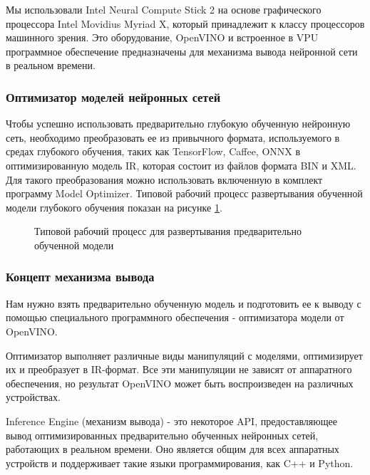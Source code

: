 \documentclass[14pt,a4paper]{scrartcl}
\begin{document}
			Мы использовали Intel Neural Compute Stick 2 на основе графического процессора Intel Movidius Myriad X, который принадлежит к классу процессоров машинного зрения. Это оборудование, OpenVINO и встроенное в VPU программное обеспечение предназначены для механизма вывода нейронной сети в реальном времени.
		
		\subsubsection{Оптимизатор моделей нейронных сетей}
		
			Чтобы успешно использовать предварительно глубокую обученную нейронную сеть, необходимо преобразовать ее из привычного формата, используемого в средах глубокого обучения, таких как TensorFlow, Caffee, ONNX в оптимизированную модель IR, которая состоит из файлов формата BIN и XML. Для такого преобразования можно использовать включенную в комплект программу Model Optimizer. Типовой рабочий процесс развертывания обученной модели глубокого обучения показан на рисунке \ref{fig:Model_Optimizer_Structure}\cite{bib:Model_Optimizer_Dev_Guide}.
			
			\begin{figure}[h]
				\caption{Типовой рабочий процесс для развертывания предварительно обученной модели}
				\label{fig:Model_Optimizer_Structure}
			\end{figure}
		
		\subsubsection{Концепт механизма вывода}
		
			Нам нужно взять предварительно обученную модель и подготовить ее к выводу с помощью специального программного обеспечения - оптимизатора модели от OpenVINO.
			
			Оптимизатор выполняет различные виды манипуляций с моделями, оптимизирует их и преобразует в IR-формат. Все эти манипуляции не зависят от аппаратного обеспечения, но результат OpenVINO может быть воспроизведен на различных устройствах\cite{bib:Deep_Learning_Computer_Vision}.	
			
			Inference Engine (механизм вывода) - это некоторое API, предоставляющее вывод оптимизированных предварительно обученных нейронных сетей, работающих в реальном времени. Оно является общим для всех аппаратных устройств и поддерживает такие языки программирования, как C++ и Python.
			
\end{document}
